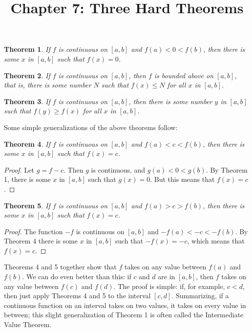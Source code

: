 \documentclass{article}
\newtheorem{theorem}{Theorem}
\begin{document}
\title{Chapter 7: Three Hard Theorems}
\maketitle

\begin{theorem}
  If $f$ is continuous on $[a, b]$ and $f(a) < 0 < f(b)$, then there is some
  $x$ in $[a, b]$ such that $f(x) = 0$.
\end{theorem}

\begin{theorem}
  If $f$ is continuous on $[a, b]$, then $f$ is bounded above on $[a, b]$, that
  is, there is some number $N$ such that $f(x) \leq N$ for all $x$ in $[a, b]$.
\end{theorem}

\begin{theorem}
  If $f$ is continuous on $[a, b]$, then there is some number $y$ in $[a, b]$
  such that $f(y) \geq f(x)$ for all $x$ in $[a, b]$.
\end{theorem}

Some simple generalizations of the above theorems follow:

\begin{theorem}
  If $f$ is continuous on $[a, b]$ and $f(a) < c < f(b)$, then there is some
  $x$ in $[a, b]$ such that $f(x) = c$.
\end{theorem}

\begin{proof}
  Let $g = f - c$. Then $g$ is continuous, and $g(a) < 0 < g(b)$. By Theorem 1,
  there is some $x$ in $[a, b]$ such that $g(x) = 0$. But this means that $f(x)
  = c$.
\end{proof}

\begin{theorem}
  If $f$ is continuous on $[a, b]$ and $f(a) > c > f(b)$, then there is some
  $x$ in $[a, b]$ such that $f(x) = c$.
\end{theorem}

\begin{proof}
  The function $-f$ is continuous on $[a, b]$ and $-f(a) < -c < -f(b)$. By
  Theorem 4 there is some $x$ in $[a, b]$ such that $-f(x) = -c$, which means
  that $f(x) = c$.
\end{proof}

Theorems 4 and 5 together show that $f$ takes on any value between $f(a)$ and
$f(b)$. We can do even better than this: if $c$ and $d$ are in $[a, b]$, then
$f$ takes on any value between $f(c)$ and $f(d)$. The proof is simple: if, for
example, $c < d$, then just apply Theorems 4 and 5 to the interval $[c, d]$.
Summarizing, if a continuous function on an interval takes on two values, it
takes on every value in between; this slight generalization of Theorem 1 is
often called the Intermediate Value Theorem.
\end{document}
